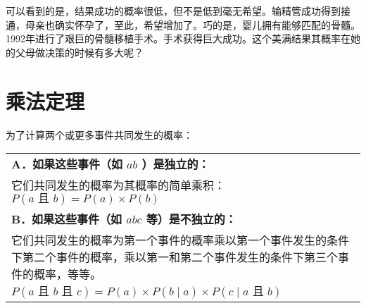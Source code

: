 可以看到的是，结果成功的概率很低，但不是低到毫无希望。输精管成功得到接通，母亲也确实怀孕了，至此，希望增加了。巧的是，婴儿拥有能够匹配的骨髓。1992年进行了艰巨的骨髓移植手术。手术获得巨大成功\cite{ayala1993}。这个美满结果其概率在她的父母做决策的时候有多大呢？

\section*{乘法定理}
为了计算两个或更多事件共同发生的概率：

\begin{center}
\begin{tabular}{|p{}|}
\hline
\textbf{A．如果这些事件（如 $a$\zhtext{、}$b$ ）是独立的：} \\
它们共同发生的概率为其概率的简单乘积：
$P(a \text { 且 } b)=P(a) \times P(b)$ \\
\hline
\textbf{B．如果这些事件（如 $a$\zhtext{、}$b$\zhtext{、}$c$ 等）是不独立的：} \\
它们共同发生的概率为第一个事件的概率乘以第一个事件发生的条件下第二个事件的概率，乘以第一和第二个事件发生的条件下第三个事件的概率，等等。 \\
$P(a \text{ 且 } b \text{ 且 } c)=P(a) \times P(b \mid a) \times P(c \mid a \text{ 且 } b)$ \\
\hline
\end{tabular}
\end{center}

